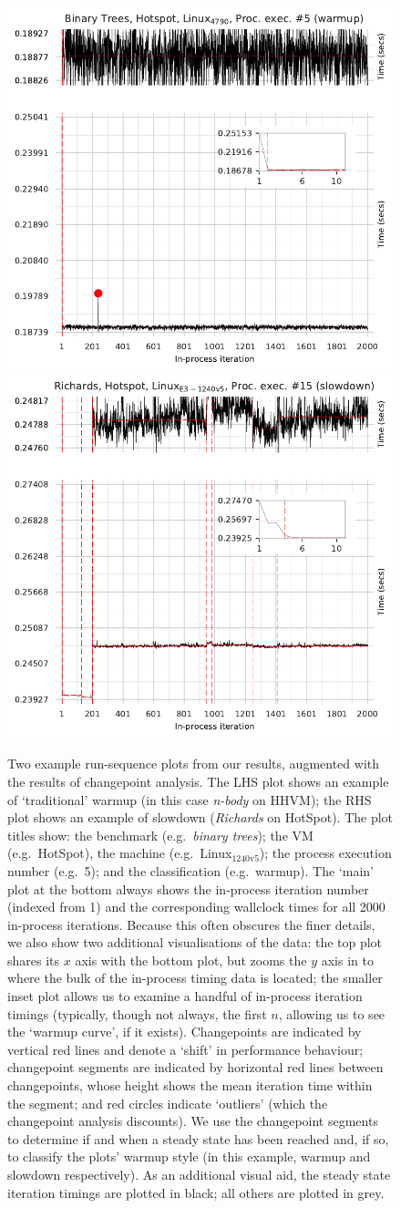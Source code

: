 \documentclass[acmlarge]{acmart}\settopmatter{printfolios=true}
\newcommand{\binarytrees}{\emph{binary trees}\xspace}
\newcommand{\richards}{\emph{Richards}\xspace}
\newcommand{\nbody}{\emph{n-body}\xspace}
\newcommand{\bencherseven}{Linux$_\mathrm{1240v5}$\xspace}
\newcommand{\numiterations}{2000\xspace}
\begin{document}
\begin{figure}[t]
\centering
\includegraphics[width=.49\textwidth]{examples/new_warmup_no_migrate.pdf}
\hspace{\fill}
\includegraphics[width=.49\textwidth]{examples/changepoint_example.pdf}
\caption{Two example run-sequence plots from our results, augmented
with the results of changepoint analysis. The LHS plot
shows an example of `traditional' warmup (in this case \nbody on HHVM);
the RHS plot shows an example of slowdown (\richards on HotSpot). The
plot titles show: the benchmark (e.g.~\binarytrees); the VM (e.g.~HotSpot),
the machine (e.g.~\bencherseven); the process execution number (e.g.~5);
and the classification (e.g.~warmup). The `main' plot at the bottom always shows
the in-process iteration number (indexed from 1) and the corresponding wallclock
times for all \numiterations in-process iterations. Because this often obscures the finer
details, we also show two additional visualisations of the data: the top plot
shares its $x$ axis with the bottom plot, but zooms the $y$ axis in to where the bulk of the
in-process timing data is located; the smaller inset plot allows us to examine a handful
of in-process iteration timings (typically, though not always, the first $n$,
allowing us to see the `warmup curve', if it exists). Changepoints
are indicated by vertical red lines and denote a `shift' in performance behaviour;
changepoint segments are indicated by horizontal red lines between changepoints,
whose height shows the mean iteration time within the segment;
and red circles indicate `outliers'
(which the changepoint analysis discounts). We use the changepoint
segments to determine if and when a steady state has been reached and,
if so, to classify the plots' warmup style (in this example, warmup and
slowdown respectively). As an additional visual aid, the steady state iteration
timings are plotted in black; all others are plotted in grey.}
\label{fig:changepoint}
\end{figure}
\end{document}
